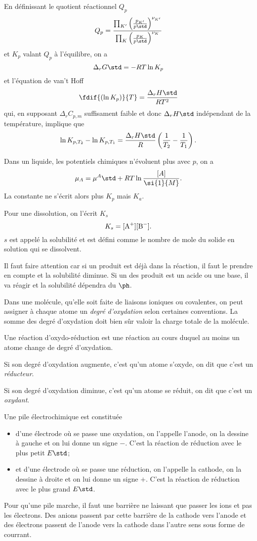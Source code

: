 En définissant le quotient réactionnel $Q_p$
\[ Q_p = \frac{\prod_{K'}\left(\frac{p_{K'}}{p\std}\right)^{\nu_{K'}}}
{\prod_{K}\left(\frac{p_{K}}{p\std}\right)^{\nu_{K}}} \]
et $K_p$ valant $Q_p$ à l'équilibre, on a
\[ \Delta_r G\std = -RT\ln K_p \]
et l'équation de van't Hoff
\[ \fdif{(\ln K_p)}{T} = \frac{\Delta_r H\std}{RT^2} \]
qui, en supposant $\Delta_r C_{p,m}$ suffisament faible
et donc $\Delta_r H\std$ indépendant
de la température, implique que
\[ \ln K_{p,T_2}-\ln K_{p,T_1} =
\frac{\Delta_r H\std}{R}\left(\frac{1}{T_2} - \frac{1}{T_1}\right). \]

Dans un liquide, les potentiels chimiques n'évoluent plus avec $p$,
on a
\[ \mu_A = {\mu^A}\std + RT \ln \frac{[A]}{\si{1}{M}}. \]
La constante ne s'écrit alors plus $K_p$ mais $K_a$.

Pour une dissolution, on l'écrit $K_s$
\[ K_s = [\ce{A+}][\ce{B-}]. \]
$s$ est appelé la solubilité et est défini comme le nombre de mole
du solide en solution qui se dissolvent.

Il faut faire attention car si un produit est déjà dans la réaction,
il faut le prendre en compte et la solubilité diminue.
Si un des produit est un acide ou une base,
il va réagir et la solubilité dépendra du $\ph$.

Dans une molécule,
qu'elle soit faite de liaisons ioniques ou covalentes,
on peut assigner à chaque atome un \emph{degré d'oxydation}
selon certaines conventions.
La somme des degré d'oxydation doit bien sûr valoir la charge totale
de la molécule.

Une réaction d'oxydo-réduction est une réaction au cours duquel
au moins un atome change de degré d'oxydation.

Si son degré d'oxydation augmente, c'est qu'un atome s'oxyde,
on dit que c'est un \emph{réducteur}.

Si son degré d'oxydation diminue, c'est qu'un atome se réduit,
on dit que c'est un \emph{oxydant}.

Une pile électrochimique est constituée
\begin{itemize}
  \item d'une électrode où se passe
    une oxydation, on l'appelle l'anode, on la dessine à gauche et
    on lui donne un signe $-$.
    C'est la réaction de réduction avec le plus petit $E\std$;
  \item et d'une électrode où se passe
    une réduction, on l'appelle la cathode, on la dessine à droite et
    on lui donne un signe $+$.
    C'est la réaction de réduction avec le plus grand $E\std$.
\end{itemize}
Pour qu'une pile marche, il faut une barrière ne laissant que passer
les ions et pas les électrons.
Des anions passent par cette barrière de la cathode vers l'anode
et des électrons passent de l'anode vers la cathode dans l'autre sens
sous forme de courrant.

